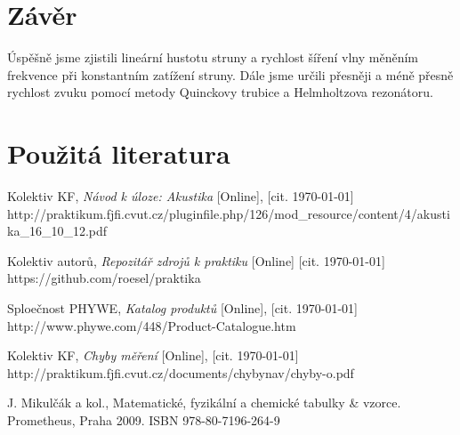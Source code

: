 \documentclass[english]{article}
\begin{document}
\section{Závěr}
	Úspěšně jsme zjistili lineární hustotu struny a rychlost šíření vlny měněním frekvence při konstantním zatížení struny. Dále jsme určili přesněji a méně přesně rychlost zvuku pomocí metody Quinckovy trubice a Helmholtzova rezonátoru. 
	
\section {Použitá literatura}
\begingroup
\renewcommand{\section}[2]{}

\begin{thebibliography}{9}
 Kolektiv KF, \emph{Návod k úloze: Akustika} [Online], [cit. \today] \newline 
http://praktikum.fjfi.cvut.cz/pluginfile.php/126/mod\_resource/content/4/akustika\_16\_10\_12.pdf

 Kolektiv autorů, \emph{Repozitář zdrojů k praktiku} [Online] [cit. \today] \newline https://github.com/roesel/praktika


 Sploečnost PHYWE, \emph{Katalog produktů} [Online], [cit. \today] \newline 
http://www.phywe.com/448/Product-Catalogue.htm

 Kolektiv KF, \emph{Chyby měření} [Online], [cit. \today] \newline http://praktikum.fjfi.cvut.cz/documents/chybynav/chyby-o.pdf

 J. Mikulčák a kol., Matematické, fyzikální a chemické tabulky \& vzorce. Prometheus,
Praha 2009.\newline
ISBN 978-80-7196-264-9

\end{thebibliography}
\endgroup
\end{document}

